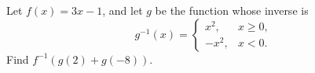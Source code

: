 Let $f(x)=3x-1$, and let $g$ be the function whose inverse is
\[g^{-1}(x)=\begin{cases}x^2,&x\ge0,\\-x^2,&x<0.\end{cases}\]
Find $f^{-1}\left(g(2)+g(-8)\right)$.
